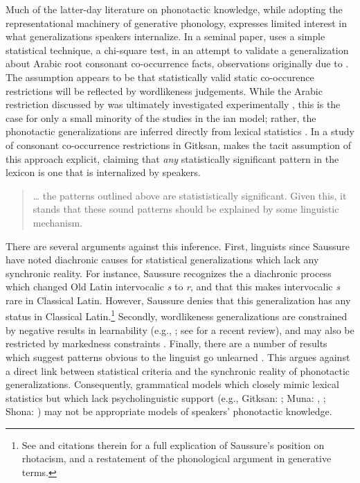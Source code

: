 Much of the latter-day literature on phonotactic knowledge, while adopting the representational machinery of generative phonology, expresses limited interest in what generalizations speakers internalize. In a seminal paper, \citet{McCarthy1988} uses a simple statistical technique, a chi-square test, in an attempt to validate a generalization about Arabic root consonant co-occurrence facts, observations originally due to \citet{Greenberg1950}. The assumption appears to be that statistically valid static co-occurence restrictions will be reflected by wordlikeness judgements. While the Arabic restriction discussed by \citeauthor{McCarthy1988} was ultimately investigated experimentally \citep{Frisch2004}, this is the case for only a small minority of the studies in the \citeauthor{McCarthy1988}ian model; rather, the phonotactic generalizations are inferred directly from lexical statistics \citep[e.g.,][]{Anttila2008a,Berkley1994b,Berkley1994a,Berkley2000,Brown2010,Buckley1997,Coetzee2008a,Dmitrieva2008a,Dmitrieva2008b,Elmedlaoui1995,Graff2011,MacEachern1999,Kinney2005,Kawahara2006,Martin2007,Martin2011,Mester1988,Miller-Ockhuizen2003,Padgett1992,Padgett1995,Pozdniakov2007,Yip1989}. In a study of consonant co-occurrence restrictions in Gitksan, \citet{Brown2010} makes the tacit assumption of this approach explicit, claiming that \emph{any} statistically significant pattern in the lexicon is one that is internalized by speakers. 

\begin{quote}
\ldots{} the patterns outlined above are statististically significant. Given this, it stands that these sound patterns should be explained by some linguistic mechanism. \citep[][48]{Brown2010}
\end{quote}

There are several arguments against this inference. First, linguists since Saussure have noted diachronic causes for statistical generalizations which lack any synchronic reality. For instance, Saussure \citeyear[202f.]{CLG} recognizes the a diachronic process which changed Old Latin intervocalic \emph{s} to \emph{r}, and that this makes intervocalic \emph{s} rare in Classical Latin. However, Saussure denies that this generalization has any status in Classical Latin.\footnote{See \citet{Gorman2012e} and citations therein for a full explication of Saussure's position on rhotacism, and a restatement of the phonological argument in generative terms.} Secondly, wordlikeness generalizations are constrained by negative results in learnability (e.g., \citealp{Gold1967}; see \citealt{Yang2012} for a recent review), and may also be restricted by markedness constraints \citep[e.g.,][]{Becker2011,Hayes2009,Moreton2002}. Finally, there are a number of results which suggest patterns obvious to the linguist go unlearned \citep{Becker2011,Hayes2006,Zimmer1969}. This argues against a direct link between statistical criteria and the synchronic reality of phonotactic generalizations. Consequently, grammatical models which closely mimic lexical statistics but which lack psycholinguistic support (e.g., Gitksan: \citealt{Brown2010}; Muna: \citealt{Anttila2008a}, \citealt{Coetzee2008a}; Shona: \citealt[][385]{Hayes2008a}) may not be appropriate models of speakers' phonotactic knowledge.

